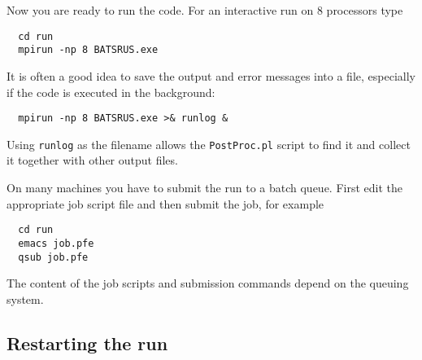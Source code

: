 Now you are ready to run the code. For an interactive run 
on 8 processors type
\begin{verbatim}
  cd run
  mpirun -np 8 BATSRUS.exe
\end{verbatim}
It is often a good idea to save the output and error messages into a file, especially if the code
is executed in the background:
\begin{verbatim}
  mpirun -np 8 BATSRUS.exe >& runlog &
\end{verbatim}
Using {\tt runlog} as the filename allows the {\tt PostProc.pl} script
to find it and collect it together with other output files.

On many machines you have to submit the run to a batch queue.
First edit the appropriate job script file and then submit the job,
for example
\begin{verbatim}
  cd run
  emacs job.pfe
  qsub job.pfe
\end{verbatim}
The content of the job scripts and submission commands depend on
the queuing system. 

\subsection{Restarting the run}

